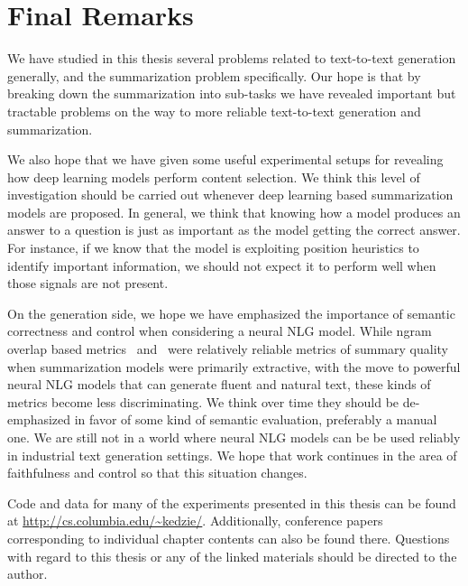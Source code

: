\section{Final Remarks}

We have studied in this thesis several problems related to text-to-text
generation generally, and the summarization problem specifically.  Our hope is
that by breaking down the summarization into sub-tasks we have revealed
important but tractable problems on the way to more reliable text-to-text
generation and summarization. 

We also hope that we have given some useful experimental setups for revealing
how deep learning models perform content selection. We think this level of
investigation should be carried out whenever deep learning based summarization
models are proposed. In general, we think that knowing how a model produces an
answer to a question is just as important as the model getting the correct
answer. For instance, if we know that the model is exploiting position
heuristics to identify important information, we should not expect it to
perform well when those signals are not present. 

On the generation side, we hope we have emphasized the importance of semantic
correctness and control when considering a neural NLG model. While ngram
overlap based metrics \rouge~and \bleu~were relatively reliable metrics of
summary quality when summarization models were primarily extractive, with the
move to powerful neural NLG models that can generate fluent and natural text,
these kinds of metrics become less discriminating.  We think over time they
should be de-emphasized in favor of some kind of semantic evaluation,
preferably a manual one. We are still not in a world where neural NLG models
can be be used reliably in industrial text generation settings. We hope that
work continues in the area of faithfulness and control so that this situation
changes.

Code and data for many of the experiments presented in this thesis can be found
at \url{http://cs.columbia.edu/~kedzie/}. Additionally, conference papers
corresponding to individual chapter contents can also be found there. Questions
with regard to this thesis or any of the linked materials should be directed to
the author.

